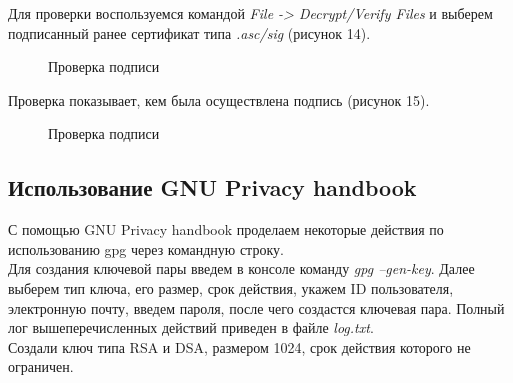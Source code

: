 \documentclass[10pt,a4paper]{report}
\begin{document}
Для проверки воспользуемся командой \textit{File -> Decrypt/Verify Files} и выберем подписанный ранее сертификат типа \textit{.asc/sig} (рисунок 14).
\begin{figure}[h]
	\caption{Проверка подписи}
\end{figure}

Проверка показывает, кем была осуществлена подпись (рисунок 15).
\begin{figure}[h]
	\caption{Проверка подписи}
\end{figure}
\subsection{Использование GNU Privacy handbook}
С помощью GNU Privacy handbook проделаем некоторые действия по использованию gpg через командную строку. \\
Для создания ключевой пары введем в консоле команду \textit{gpg --gen-key}. Далее выберем тип ключа, его размер, срок действия, укажем ID пользователя, электронную почту, введем пароля, после чего создастся ключевая пара. Полный лог вышеперечисленных действий приведен в файле \textit{log.txt}. \\
Создали ключ типа RSA и DSA, размером 1024, срок действия которого не ограничен. \\
 
\end{document}
